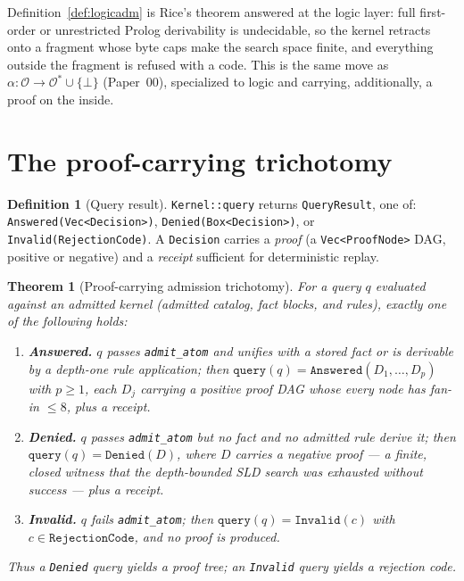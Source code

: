 \documentclass[11pt,oneside]{book}
\theoremstyle{definition}
\newtheorem{definition}{Definition}[chapter]
\theoremstyle{plain}
\newtheorem{theorem}{Theorem}[chapter]
\theoremstyle{remark}
\newcommand{\Obs}{\mathcal{O}}                 %
\newcommand{\Adm}{\mathcal{O}^{*}}             %
\newcommand{\adm}{\alpha}                      %
\newcommand{\Rfsl}{\bot}                        %
\newcommand{\code}[1]{\texttt{#1}}
\begin{document}
Definition~\ref{def:logicadm} is Rice's theorem \cite{rice1953} answered at the logic layer:
full first-order or unrestricted Prolog derivability is undecidable, so the kernel retracts
onto a fragment whose byte caps make the search space finite, and everything outside the
fragment is refused with a code. This is the same move as $\adm:\Obs\to\Adm\cup\{\Rfsl\}$
(Paper~00), specialized to logic and carrying, additionally, a proof on the inside.

\section{The proof-carrying trichotomy}

\begin{definition}[Query result]\label{def:queryresult}
\code{Kernel::query} returns \code{QueryResult}, one of: \code{Answered(Vec<Decision>)},
\code{Denied(Box<Decision>)}, or \code{Invalid(RejectionCode)}. A \code{Decision} carries a
\emph{proof} (a \code{Vec<ProofNode>} DAG, positive or negative) and a \emph{receipt} sufficient
for deterministic replay.
\end{definition}

\begin{theorem}[Proof-carrying admission trichotomy]\label{thm:trichotomy}
For a query $q$ evaluated against an admitted kernel (admitted catalog, fact blocks, and
rules), exactly one of the following holds:
\begin{enumerate}[label=(\alph*),leftmargin=*]
\item \textbf{Answered.} $q$ passes \code{admit\_atom} and unifies with a stored fact or is
derivable by a depth-one rule application; then $\code{query}(q)=\code{Answered}(D_1,\dots,D_p)$
with $p\ge 1$, each $D_j$ carrying a \emph{positive} proof DAG whose every node has fan-in
$\le 8$, plus a receipt.
\item \textbf{Denied.} $q$ passes \code{admit\_atom} but no fact and no admitted rule derive it;
then $\code{query}(q)=\code{Denied}(D)$, where $D$ carries a \emph{negative} proof --- a finite,
closed witness that the depth-bounded SLD search was exhausted without success --- plus a
receipt.
\item \textbf{Invalid.} $q$ fails \code{admit\_atom}; then
$\code{query}(q)=\code{Invalid}(c)$ with $c\in\code{RejectionCode}$, and \emph{no proof is
produced}.
\end{enumerate}
Thus a \code{Denied} query yields a proof tree; an \code{Invalid} query yields a rejection code.
\end{theorem}
\end{document}
